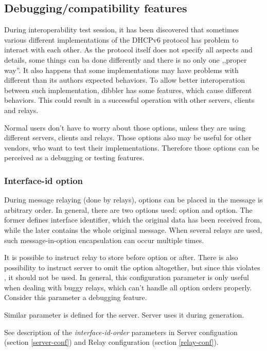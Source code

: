 \subsection{Debugging/compatibility features}
During interoperability test session, it has been discovered that
sometimes various different implementations of the DHCPv6 protocol has
problem to interact with each other. As the protocol itself does not
specify all aspects and details, some things can ba done differently
and there is no only one ,,proper way''. It also happens that some
implementations may have problems with different than its authors
expected behaviors. To allow better interoperation between such
implementation, dibbler has some features, which cause different
behaviors. This could result in a successful operation with other
servers, clients and relays.

Normal users don't have to worry about those options, unless they are
using different servers, clients and relays. Those options also may be
useful for other vendors, who want to test their
implementations. Therefore those options can be perceived as a
debugging or testing features.

\subsubsection{Interface-id option}
During message relaying (done by relays), options can be placed in the
 message is arbitrary order. In general, there are two
options used:  option and 
option. The former defines interface identifier, which the original
data has been received from, while the later contains the whole
original message. When several relays are used, such message-in-option
encapsulation can occur multiple times.

It is possible to instruct relay to store  before
 option or after. There is also possibility to
instruct server to omit the  option altogether, but
since this violates \cite{rfc3315}, it should not be used. In general,
this configuration parameter is only useful when dealing with buggy
relays, which can't handle all option orders properly. Consider this
parameter a debugging feature.

Similar parameter is defined for the server. Server uses it during
 generation.

See description of the \emph{interface-id-order} parameters in Server
configuation (section \ref{server-conf}) and Relay configuration
(section \ref{relay-conf}).


